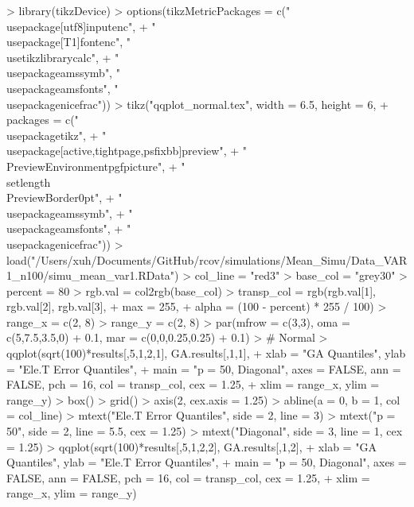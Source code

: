 \documentclass{article}
\begin{document}


\begin{Schunk}
\begin{Sinput}
> library(tikzDevice)
> options(tikzMetricPackages = c("\\usepackage[utf8]{inputenc}",
+     "\\usepackage[T1]{fontenc}", "\\usetikzlibrary{calc}",
+     "\\usepackage{amssymb}", "\\usepackage{amsfonts}", "\\usepackage{nicefrac}"))
> tikz("qqplot_normal.tex", width = 6.5, height = 6,
+      packages = c("\\usepackage{tikz}",
+                  "\\usepackage[active,tightpage,psfixbb]{preview}",
+                  "\\PreviewEnvironment{pgfpicture}",
+                  "\\setlength\\PreviewBorder{0pt}",
+                  "\\usepackage{amssymb}",
+                  "\\usepackage{amsfonts}",
+                  "\\usepackage{nicefrac}"))
> load("/Users/xuh/Documents/GitHub/rcov/simulations/Mean_Simu/Data_VAR1_n100/simu_mean_var1.RData")
> col_line = "red3"
> base_col = "grey30"
> percent = 80
> rgb.val = col2rgb(base_col)
> transp_col = rgb(rgb.val[1], rgb.val[2], rgb.val[3],
+              max = 255,
+              alpha = (100 - percent) * 255 / 100)
> range_x = c(2, 8)
> range_y = c(2, 8)
> par(mfrow = c(3,3), oma = c(5,7.5,3.5,0) + 0.1, mar = c(0,0,0.25,0.25) + 0.1)
> # Normal
> qqplot(sqrt(100)*results[,5,1,2,1], GA.results[,1,1],
+        xlab = "GA Quantiles", ylab = "Ele.T Error Quantiles",
+        main = "p = 50, Diagonal", axes = FALSE, ann = FALSE, pch = 16, col = transp_col, cex = 1.25,
+        xlim = range_x, ylim = range_y)
> box()
> grid()
> axis(2, cex.axis = 1.25)
> abline(a = 0, b = 1, col = col_line)
> mtext("Ele.T Error Quantiles", side = 2, line = 3)
> mtext("p = 50", side = 2, line = 5.5, cex = 1.25)
> mtext("Diagonal", side = 3, line = 1, cex = 1.25)
> qqplot(sqrt(100)*results[,5,1,2,2], GA.results[,1,2],
+        xlab = "GA Quantiles", ylab = "Ele.T Error Quantiles",
+        main = "p = 50, Diagonal", axes = FALSE, ann = FALSE, pch = 16, col = transp_col, cex = 1.25,
+        xlim = range_x, ylim = range_y)

\end{Sinput}
\end{Schunk}
\end{document}
